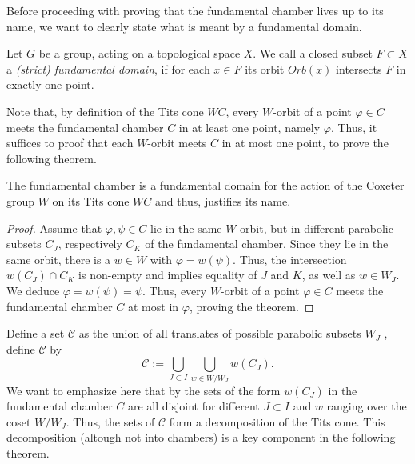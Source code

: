 Before proceeding with proving that the fundamental chamber lives up to its name, we want to clearly state what is meant by a fundamental domain.

\begin{definition}
    Let \(G\) be a group, acting on a topological space \(X\).
    We call a closed subset \(F\subset X\) a \emph{(strict) fundamental domain}, if for each \(x\in F\) its orbit \(Orb(x)\) intersects \(F\) in exactly one point.
\end{definition}

Note that, by definition of the Tits cone \(WC\), every \(W\)-orbit of a point \(\varphi\in C\) meets the fundamental chamber \(C\) in at least one point, namely \(\varphi\). %
Thus, it suffices to proof that each \(W\)-orbit meets \(C\) in at most one point, to prove the following theorem.

\begin{theorem}\label{thm:funddomain}
    The fundamental chamber is a fundamental domain for the action of the Coxeter group \(W\) on its Tits cone \(WC\) and thus, justifies its name.
\end{theorem}
\begin{proof}
    Assume that \(\varphi,\psi\in C\) lie in the same \(W\)-orbit, but in different parabolic subsets \(C_J\), respectively \(C_K\) of the fundamental chamber. %
    Since they lie in the same orbit, there is a \(w\in W\) with \(\varphi = w(\psi)\).
    Thus, the intersection \(w(C_J)\cap C_K\) is non-empty and  implies equality of \(J\) and \(K\), as well as \(w \in W_J\).
    We deduce \(\varphi = w(\psi) = \psi\).
    Thus, every \(W\)-orbit of a point \(\varphi\in C\) meets the fundamental chamber \(C\) at most in \(\varphi\), proving the theorem.
\end{proof}

Define a set \(\mathcal{C}\) as the union of all translates of possible parabolic subsets \(W_J\) \ie, define \(\mathcal{C}\) by
\[\mathcal{C} := \bigcup_{J \subset I} \bigcup_{w \in W/W_J} w(C_J).\]
We want to emphasize here that by  the sets of the form \(w(C_J)\) in the fundamental chamber \(C\) are all disjoint for different \(J \subset I\) and \(w\) ranging over the coset \(W/W_J\).
Thus, the sets of \(\mathcal{C}\) form a decomposition of the Tits cone.
This decomposition (altough not into chambers) is a key component in the following theorem.

